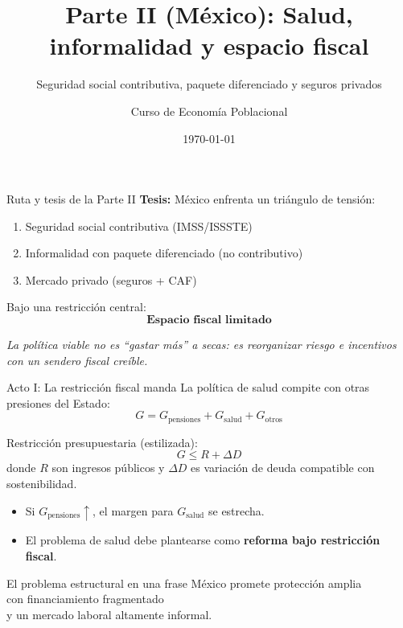 \documentclass[10pt]{beamer}
\title[Salud en México]{Parte II (México): Salud, informalidad y espacio fiscal}
\subtitle{Seguridad social contributiva, paquete diferenciado y seguros privados}
\author{Curso de Economía Poblacional}
\institute{Tecnológico de Monterrey}
\date{\today}
\begin{document}
\begin{frame}
\titlepage
\end{frame}

\begin{frame}{Ruta y tesis de la Parte II}
\textbf{Tesis:} México enfrenta un triángulo de tensión:
\begin{enumerate}
  \item Seguridad social contributiva (IMSS/ISSSTE)
  \item Informalidad con paquete diferenciado (no contributivo)
  \item Mercado privado (seguros + CAF)
\end{enumerate}

\bigskip
Bajo una restricción central:
\[
\textbf{Espacio fiscal limitado}
\]

\bigskip
\emph{La política viable no es “gastar más” a secas: es reorganizar riesgo e incentivos con un sendero fiscal creíble.}
\end{frame}


\begin{frame}{Acto I: La restricción fiscal manda}
La política de salud compite con otras presiones del Estado:
\[
G = G_{\text{pensiones}} + G_{\text{salud}} + G_{\text{otros}}
\]

Restricción presupuestaria (estilizada):
\[
G \le R + \Delta D
\]
donde \(R\) son ingresos públicos y \(\Delta D\) es variación de deuda compatible con sostenibilidad.

\bigskip
\begin{itemize}
  \item Si \(G_{\text{pensiones}}\uparrow\), el margen para \(G_{\text{salud}}\) se estrecha.
  \item El problema de salud debe plantearse como \textbf{reforma bajo restricción fiscal}.
\end{itemize}
\end{frame}

\begin{frame}{El problema estructural en una frase}
\centering
\Large
México promete protección amplia\\
con financiamiento fragmentado\\
y un mercado laboral altamente informal.
\end{frame}
\end{document}
